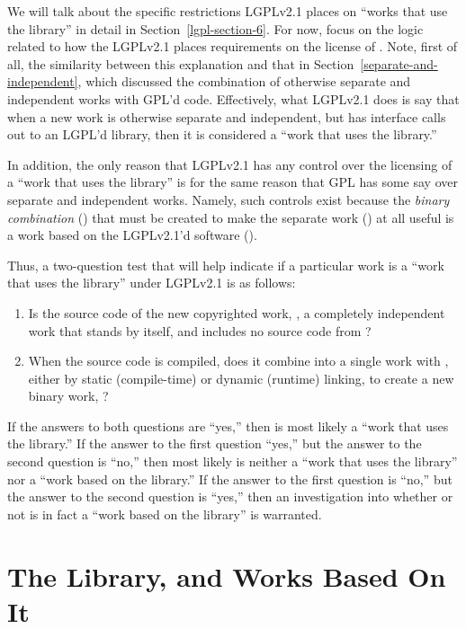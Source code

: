 We will talk about the specific restrictions LGPLv2.1 places on ``works
that use the library'' in detail in Section~\ref{lgpl-section-6}. For
now, focus on the logic related to how the LGPLv2.1 places requirements on
the license of \lplusi{}. Note, first of all, the similarity between
this explanation and that in Section~\ref{separate-and-independent},
which discussed the combination of otherwise separate and independent
works with GPL'd code. Effectively, what LGPLv2.1 does is say that when a
new work is otherwise separate and independent, but has interface
calls out to an LGPL'd library, then it is considered a ``work that
uses the library.''

In addition, the only reason that LGPLv2.1 has any control over the licensing
of a ``work that uses the library'' is for the same reason that GPL has
some say over separate and independent works. Namely, such controls exist
because the {\em binary combination\/} (\lplusi{}) that must be created to
make the separate work (\worki{}) at all useful is a  work based on
the LGPLv2.1'd software (\workl{}).

Thus, a two-question test that will help indicate if a particular work is
a ``work that uses the library'' under LGPLv2.1 is as follows:

\begin{enumerate}

\item Is the source code of the new copyrighted work, \worki{}, a
  completely independent work that stands by itself, and includes no
  source code from \workl{}?

\item When the source code is compiled, does it combine into a single work
  with \workl{}, either by static (compile-time) or dynamic
  (runtime) linking, to create a new binary work, \lplusi{}?
\end{enumerate}

If the answers to both questions are ``yes,'' then \worki{} is most likely
a ``work that uses the library.''  If the answer to the first question
``yes,'' but the answer to the second question is ``no,'' then most likely
\worki{} is neither a ``work that uses the library'' nor a ``work based on
the library.''  If the answer to the first question is ``no,'' but the
answer to the second question is ``yes,'' then an investigation into
whether or not \worki{} is in fact a ``work based on the library'' is
warranted.

\section{The Library, and Works Based On It}

